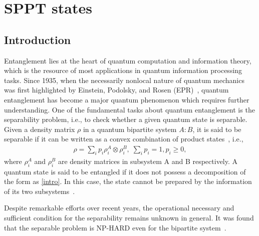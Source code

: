 




\chapter{SPPT states}
\section{Introduction}
Entanglement lies at the heart of quantum computation and information theory, which is the resource of most
applications in quantum information processing tasks.  Since 1935, when the necessarily nonlocal nature of quantum mechanics was
first highlighted by Einstein, Podolsky, and Rosen (EPR)~\cite{einstein1935can}, quantum entanglement has become a major
quantum phenomenon  which requires further understanding. One of the fundamental tasks about quantum entanglement is the
 separability problem, i.e.,  to check whether a given quantum state is separable.  Given a density
matrix $\rho$ in a quantum bipartite system $A:B$,   it is  said to be separable if it can be written as a convex combination
of product states~\cite{Werner1989},  i.e., 
\begin{align}
  \label{intro}
  \rho=\sum_i p_i\rho_i^A\otimes\rho_i^B,\;\sum_i p_i = 1,p_i\geqslant 0,
\end{align}
where $\rho_i^A$ and $\rho^B_i$ are density matrices  in subsystem A and  B respectively. A quantum state is said to be
 entangled if it does not possess a decomposition of the form as \cref{intro}. In this case, 
 the state cannot  be prepared by the  information of its two subsystems~\cite{Peres1996a}.


Despite  remarkable efforts over recent years, the operational necessary and sufficient condition for the
separability   remains unknown in general. It was found that the separable problem is NP-HARD even for
the bipartite system~\cite{gurvits2003classical}.

